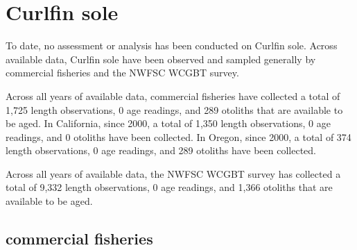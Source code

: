 \documentclass[11pt,
  english,
  letterpaper,
]{article}
\begin{document}

\hypertarget{curlfin-sole}{%
\section{Curlfin sole}\label{curlfin-sole}}

\leavevmode\tagmcend\tagstructend


To date, no assessment or analysis has been conducted on Curlfin sole. Across available data, Curlfin sole have been observed and sampled generally by commercial fisheries and the NWFSC WCGBT survey.

\leavevmode\tagmcend\tagstructend\par


Across all years of available data, commercial fisheries have collected a total of 1,725 length observations, 0 age readings, and 289 otoliths that are available to be aged. In California, since 2000, a total of 1,350 length observations, 0 age readings, and 0 otoliths have been collected. In Oregon, since 2000, a total of 374 length observations, 0 age readings, and 289 otoliths have been collected.

\leavevmode\tagmcend\tagstructend\par


Across all years of available data, the NWFSC WCGBT survey has collected a total of 9,332 length observations, 0 age readings, and 1,366 otoliths that are available to be aged.

\leavevmode\tagmcend\tagstructend\par


\hypertarget{commercial-fisheries-16}{%
\subsection{commercial fisheries}\label{commercial-fisheries-16}}

\leavevmode\tagmcend\tagstructend


\begingroup\fontsize{10}{12}\selectfont \begingroup\fontsize{10}{12}\selectfont
\end{document}
